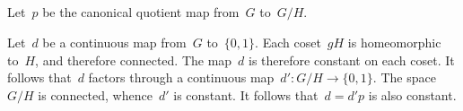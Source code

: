 \subsection{}

Let~$p$ be the canonical quotient map from~$G$ to~$G / H$.

Let~$d$ be a continuous map from~$G$ to~$\{ 0, 1\}$.
Each coset~$g H$ is homeomorphic to~$H$, and therefore connected.
The map~$d$ is therefore constant on each coset.
It follows that~$d$ factors through a continuous map~$d' \colon G/H \to \{ 0, 1\}$.
The space~$G / H$ is connected, whence~$d'$ is constant.
It follows that~$d = d' p$ is also constant.
